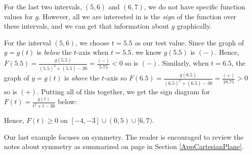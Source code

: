\documentclass{ximera}
\begin{document}
\begin{example}
\begin{explanation}
\begin{enumerate}
For the last two intervals, $(5,6)$ and $(6,7)$, we do not have specific function values for $g$.  However, all we are interested in is the \textit{sign} of the function over these intervals, and we can get that information about $g$ graphically.  


For the interval $(5,6)$, we choose $t = 5.5$ as our test value.  Since the graph of $y=g(t)$ is \textit{below} the $t$-axis when $t = 5.5$. we know $g(5.5)$ is $(-)$.  Hence, $F(5.5) = \frac{g(5.5)}{(5.5)^2+(5.5)-30} = \frac{(-)}{5.75}<0$ so is $(-)$.  Similarly, when $t = 6.5$, the graph of $y = g(t)$ is \textit{above} the $t$-axis so $F(6.5) = \frac{g(6.5)}{ (6.5)^2+(6.5)-30} = \frac{(+)}{18.75}>0$ so is $(+)$.  Putting all of this together, we get the sign diagram for $F(t) =  \frac{g(t)}{t^2+t-30}$ below:

\begin{image}
\end{image}

Hence, $F(t) \geq 0$ on $[-4,-3] \cup (0,5) \cup [6, 7)$.

\end{enumerate}
\end{explanation}

\end{example}

Our last example focuses on symmetry.  The reader is encouraged to review the notes about symmetry as summarized on  page \pageref{reflectionsinabox} in Section \ref{AppCartesianPlane}.
\end{document}
